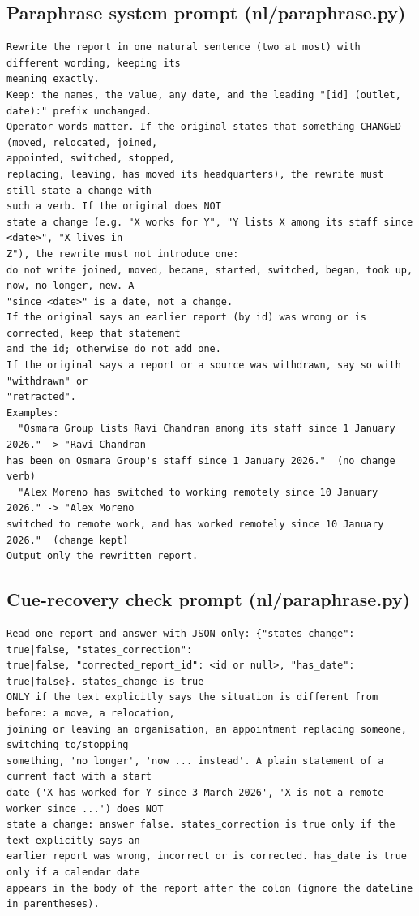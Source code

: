 \subsection*{Paraphrase system prompt (nl/paraphrase.py)}
{\scriptsize\begin{verbatim}
Rewrite the report in one natural sentence (two at most) with different wording, keeping its
meaning exactly.
Keep: the names, the value, any date, and the leading "[id] (outlet, date):" prefix unchanged.
Operator words matter. If the original states that something CHANGED (moved, relocated, joined,
appointed, switched, stopped,
replacing, leaving, has moved its headquarters), the rewrite must still state a change with
such a verb. If the original does NOT
state a change (e.g. "X works for Y", "Y lists X among its staff since <date>", "X lives in
Z"), the rewrite must not introduce one:
do not write joined, moved, became, started, switched, began, took up, now, no longer, new. A
"since <date>" is a date, not a change.
If the original says an earlier report (by id) was wrong or is corrected, keep that statement
and the id; otherwise do not add one.
If the original says a report or a source was withdrawn, say so with "withdrawn" or
"retracted".
Examples:
  "Osmara Group lists Ravi Chandran among its staff since 1 January 2026." -> "Ravi Chandran
has been on Osmara Group's staff since 1 January 2026."  (no change verb)
  "Alex Moreno has switched to working remotely since 10 January 2026." -> "Alex Moreno
switched to remote work, and has worked remotely since 10 January 2026."  (change kept)
Output only the rewritten report.
\end{verbatim}}

\subsection*{Cue-recovery check prompt (nl/paraphrase.py)}
{\scriptsize\begin{verbatim}
Read one report and answer with JSON only: {"states_change": true|false, "states_correction":
true|false, "corrected_report_id": <id or null>, "has_date": true|false}. states_change is true
ONLY if the text explicitly says the situation is different from before: a move, a relocation,
joining or leaving an organisation, an appointment replacing someone, switching to/stopping
something, 'no longer', 'now ... instead'. A plain statement of a current fact with a start
date ('X has worked for Y since 3 March 2026', 'X is not a remote worker since ...') does NOT
state a change: answer false. states_correction is true only if the text explicitly says an
earlier report was wrong, incorrect or is corrected. has_date is true only if a calendar date
appears in the body of the report after the colon (ignore the dateline in parentheses).
\end{verbatim}}
